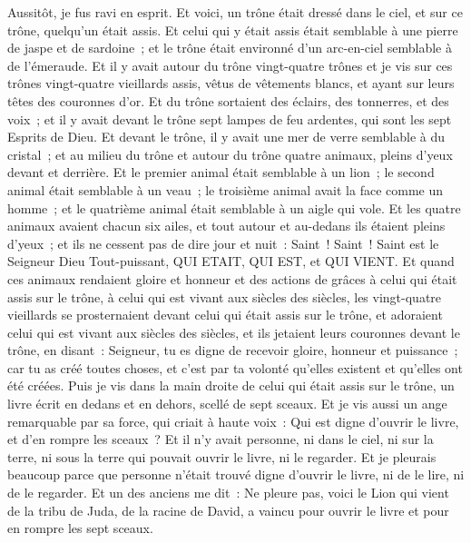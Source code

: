 \begin{multicols}{2}
Aussitôt, je fus ravi en esprit. Et voici, un trône était dressé dans le ciel, et sur ce trône, quelqu'un était assis.
Et celui qui y était assis était semblable à une pierre de jaspe et de sardoine~; et le trône était environné d'un arc-en-ciel semblable à de l'émeraude.
Et il y avait autour du trône vingt-quatre trônes et je vis sur ces trônes vingt-quatre vieillards assis, vêtus de vêtements blancs, et ayant sur leurs têtes des couronnes d'or.
Et du trône sortaient des éclairs, des tonnerres, et des voix~; et il y avait devant le trône sept lampes de feu ardentes, qui sont les sept Esprits de Dieu.
Et devant le trône, il y avait une mer de verre semblable à du cristal~; et au milieu du trône et autour du trône quatre animaux, pleins d'yeux devant et derrière.
Et le premier animal était semblable à un lion~; le second animal était semblable à un veau~; le troisième animal avait la face comme un homme~; et le quatrième animal était semblable à un aigle qui vole.
Et les quatre animaux avaient chacun six ailes, et tout autour et au-dedans ils étaient pleins d'yeux~; et ils ne cessent pas de dire jour et nuit~: Saint~! Saint~! Saint est le Seigneur Dieu Tout-puissant, QUI ETAIT, QUI EST, et QUI VIENT.
Et quand ces animaux rendaient gloire et honneur et des actions de grâces à celui qui était assis sur le trône, à celui qui est vivant aux siècles des siècles,
les vingt-quatre vieillards se prosternaient devant celui qui était assis sur le trône, et adoraient celui qui est vivant aux siècles des siècles, et ils jetaient leurs couronnes devant le trône, en disant~:
Seigneur, tu es digne de recevoir gloire, honneur et puissance~; car tu as créé toutes choses, et c'est par ta volonté qu'elles existent et qu'elles ont été créées.
\VerseOne{}Puis je vis dans la main droite de celui qui était assis sur le trône, un livre écrit en dedans et en dehors, scellé de sept sceaux.
Et je vis aussi un ange remarquable par sa force, qui criait à haute voix~: Qui est digne d'ouvrir le livre, et d'en rompre les sceaux~?
Et il n'y avait personne, ni dans le ciel, ni sur la terre, ni sous la terre qui pouvait ouvrir le livre, ni le regarder.
Et je pleurais beaucoup parce que personne n'était trouvé digne d'ouvrir le livre, ni de le lire, ni de le regarder.
Et un des anciens me dit~: Ne pleure pas, voici le Lion qui vient de la tribu de Juda, de la racine de David, a vaincu pour ouvrir le livre et pour en rompre les sept sceaux.

\end{multicols}
